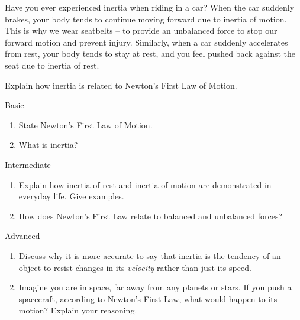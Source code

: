 \begin{example}
Have you ever experienced inertia when riding in a car?  When the car suddenly brakes, your body tends to continue moving forward due to inertia of motion.  This is why we wear seatbelts – to provide an unbalanced force to stop our forward motion and prevent injury.  Similarly, when a car suddenly accelerates from rest, your body tends to stay at rest, and you feel pushed back against the seat due to inertia of rest.
\end{example}

\begin{stopandthink}
Explain how inertia is related to Newton's First Law of Motion.
\end{stopandthink}

\begin{tieredquestions}{Basic}
\begin{enumerate}
    \item State Newton's First Law of Motion.
    \item What is inertia?
\end{enumerate}
\end{tieredquestions}

\begin{tieredquestions}{Intermediate}
\begin{enumerate}
    \item Explain how inertia of rest and inertia of motion are demonstrated in everyday life. Give examples.
    \item How does Newton's First Law relate to balanced and unbalanced forces?
\end{enumerate}
\end{tieredquestions}

\begin{tieredquestions}{Advanced}
\begin{enumerate}
    \item  Discuss why it is more accurate to say that inertia is the tendency of an object to resist changes in its \textit{velocity} rather than just its speed.
    \item  Imagine you are in space, far away from any planets or stars.  If you push a spacecraft, according to Newton's First Law, what would happen to its motion? Explain your reasoning.
\end{enumerate}
\end{tieredquestions}


\FloatBarrier

